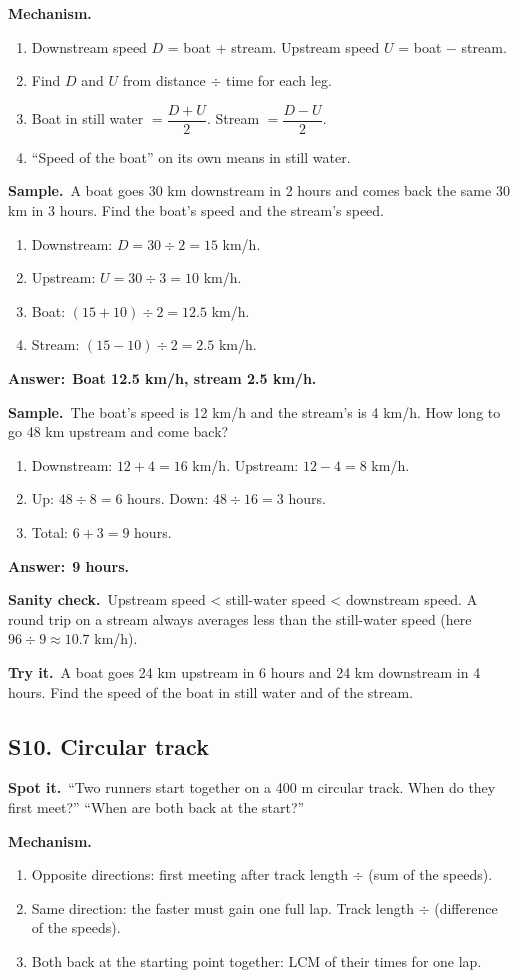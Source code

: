 \documentclass[11pt,a4paper]{article}
\let\oldsubsection\subsection
\renewcommand{\subsection}{\needspace{9\baselineskip}\oldsubsection}
\newcommand{\spot}{\textbf{\color{ember}Spot it.}\ }
\newcommand{\mech}{\textbf{\color{ember}Mechanism.}\ }
\newif\ifkeepsamp
\newcommand{\ans}[1]{\par\nopagebreak\noindent\textbf{\color{ember}Answer:}\ \textbf{#1}\par}
\newcommand{\samp}{\ifkeepsamp\needspace{4\baselineskip}\fi\textbf{\color{ember}Sample.}\ }
\newcommand{\sane}{\textbf{\color{slate}Sanity check.}\ }
\newcommand{\tryit}[1]{\textbf{\color{ember}Try it.}\ #1}
\begin{document}
\mech
\begin{enumerate}
\item Downstream speed $D$ = boat + stream. Upstream speed $U$ = boat $-$ stream.
\item Find $D$ and $U$ from distance $\div$ time for each leg.
\item Boat in still water $=\dfrac{D+U}{2}$. Stream $=\dfrac{D-U}{2}$.
\item ``Speed of the boat'' on its own means in still water.
\end{enumerate}

\samp A boat goes 30 km downstream in 2 hours and comes back the same 30 km in 3 hours. Find the boat's speed and the stream's speed.
\begin{enumerate}
\item Downstream: $D = 30 \div 2 = 15$ km/h.
\item Upstream: $U = 30 \div 3 = 10$ km/h.
\item Boat: $(15 + 10) \div 2 = 12.5$ km/h.
\item Stream: $(15 - 10) \div 2 = 2.5$ km/h.
\end{enumerate}
\ans{Boat 12.5 km/h, stream 2.5 km/h.}

\samp The boat's speed is 12 km/h and the stream's is 4 km/h. How long to go 48 km upstream and come back?
\begin{enumerate}
\item Downstream: $12 + 4 = 16$ km/h. Upstream: $12 - 4 = 8$ km/h.
\item Up: $48 \div 8 = 6$ hours. Down: $48 \div 16 = 3$ hours.
\item Total: $6 + 3 = 9$ hours.
\end{enumerate}
\ans{9 hours.}

\sane Upstream speed < still-water speed < downstream speed. A round trip on a stream always averages less than the still-water speed (here $96 \div 9 \approx 10.7$ km/h).

\tryit A boat goes 24 km upstream in 6 hours and 24 km downstream in 4 hours. Find the speed of the boat in still water and of the stream.

\subsection{S10. Circular track}
\spot ``Two runners start together on a 400 m circular track. When do they first meet?'' ``When are both back at the start?''

\mech
\begin{enumerate}
\item Opposite directions: first meeting after track length $\div$ (sum of the speeds).
\item Same direction: the faster must gain one full lap. Track length $\div$ (difference of the speeds).
\item Both back at the starting point together: LCM of their times for one lap.
\end{enumerate}
\end{document}
